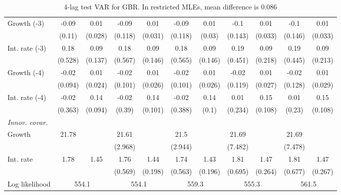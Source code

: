 \begin{table}[htbp]
\begin{tabular}{@{\extracolsep{4pt}}lcccccccccc@{}}
\quad Growth (-3) 	 &-0.09 	 & 0.01 	 & -0.09 	 & 0.01 	 & -0.09 	 & 0.01 	 & -0.1 	 & 0.01 	 & -0.1 	 & 0.01	 \\ 
 		 & (0.11) 	 & (0.028) 	 & (0.118) 	 & (0.031) 	 & (0.118) 	 & (0.03) 	 & (0.143) 	 & (0.033) 	 & (0.146) 	 & (0.033) 	 \\ 
\quad Int. rate (-3) 	 &0.18 	 & 0.09 	 & 0.18 	 & 0.09 	 & 0.18 	 & 0.09 	 & 0.19 	 & 0.09 	 & 0.19 	 & 0.09	 \\ 
 		 & (0.528) 	 & (0.137) 	 & (0.567) 	 & (0.146) 	 & (0.565) 	 & (0.146) 	 & (0.451) 	 & (0.218) 	 & (0.445) 	 & (0.213) 	 \\ 
\quad Growth (-4) 	 &-0.02 	 & 0.01 	 & -0.02 	 & 0.01 	 & -0.02 	 & 0.01 	 & -0.02 	 & 0.01 	 & -0.02 	 & 0.01	 \\ 
 		 & (0.094) 	 & (0.024) 	 & (0.101) 	 & (0.026) 	 & (0.101) 	 & (0.026) 	 & (0.119) 	 & (0.027) 	 & (0.128) 	 & (0.029) 	 \\ 
\quad Int. rate (-4) 	 &-0.02 	 & 0.14 	 & -0.02 	 & 0.14 	 & -0.02 	 & 0.14 	 & 0.01 	 & 0.15 	 & 0.01 	 & 0.15	 \\ 
 		 & (0.363) 	 & (0.094) 	 & (0.39) 	 & (0.101) 	 & (0.388) 	 & (0.1) 	 & (0.234) 	 & (0.108) 	 & (0.23) 	 & (0.108) 	 \\ 
\rule{0pt}{4ex} \emph{Innov. covar.}  	 & 	 & 	 & 	 & 	 & 	 & 	 & 	 & 	 & 	 &\\ 
\quad Growth 	 &21.78 	 &  	 & 21.61 	 &  	 & 21.5 	 &  	 & 21.69 	 &  	 & 21.69 	 & 	 \\ 
 		 &  	 &  	 & (2.968) 	 &  	 & (2.944) 	 &  	 & (7.482) 	 &  	 & (7.478) 	 &  	 \\ 
\quad Int. rate 	 &1.78 	 & 1.45 	 & 1.76 	 & 1.44 	 & 1.74 	 & 1.43 	 & 1.81 	 & 1.47 	 & 1.81 	 & 1.47	 \\ 
 		 &  	 &  	 & (0.569) 	 & (0.198) 	 & (0.563) 	 & (0.196) 	 & (0.695) 	 & (0.264) 	 & (0.677) 	 & (0.267) 	 \\ 
 \hline \rule{0pt}{4ex} 
  Log likelihood 	 &\multicolumn{2}{c}{554.1} 	 & \multicolumn{2}{c}{554.1} 	 & \multicolumn{2}{c}{559.3} 	 & \multicolumn{2}{c}{555.3} 	 & \multicolumn{2}{c}{561.5}\\ 

 \hline 	\end{tabular}		\caption{4-lag test VAR for GBR. In restricted MLEs, mean difference is 0.086}
		\label{tab:GBR4lag}

\end{table}